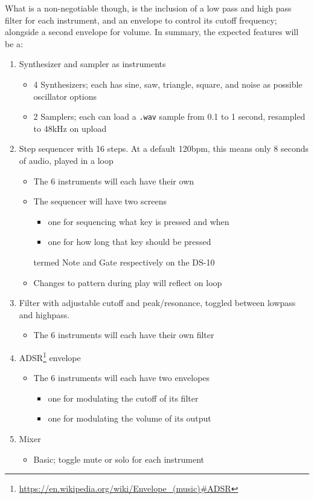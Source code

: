 What is a non-negotiable 
though, is the inclusion of a low pass and high pass filter for each instrument, 
and an envelope to control its cutoff frequency; alongside a second envelope for volume. In summary,
the expected features will be a:
\begin{enumerate}
	\item Synthesizer and sampler as instruments
		\begin{itemize}
		\item 4 Synthesizers; each has sine, saw, triangle, square, and noise as possible oscillator options
		\item 2 Samplers; each can load a \texttt{.wav} sample from 0.1 to 1 second, resampled to 48kHz on upload
		\end{itemize}
	\item Step sequencer with 16 steps. At a default 120bpm, this means only 8 seconds of audio, played in a loop
		\begin{itemize}
		\item The 6 instruments will each have their own
		\item The sequencer will have two screens
			\begin{itemize}
			\item one for sequencing what key is pressed and when
			\item one for how long that key should be pressed
			\end{itemize}
		termed Note and Gate respectively on the DS-10
		\item Changes to pattern during play will reflect on loop
		\end{itemize}
	\item Filter with adjustable cutoff and peak/resonance, toggled between lowpass and highpass.
		\begin{itemize}
		\item The 6 instruments will each have their own filter
		\end{itemize}
	\item ADSR\footnote{\url{https://en.wikipedia.org/wiki/Envelope_(music)\#ADSR}} envelope
		\begin{itemize}
		\item The 6 instruments will each have two envelopes
			\begin{itemize}
			\item one for modulating the cutoff of its filter
			\item one for modulating the volume of its output
			\end{itemize}
		\end{itemize}
	\item Mixer
		\begin{itemize}
		\item Basic; toggle mute or solo for each instrument
		\end{itemize}
\end{enumerate}

